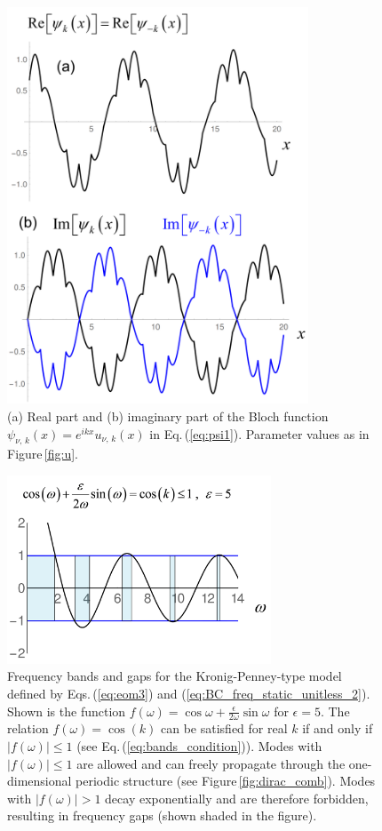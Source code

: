 \begin{figure}
    \centering
    \includegraphics[width=0.8\textwidth, keepaspectratio]{figures/system/psi.png}
    \caption{(a) Real part and (b) imaginary part of the Bloch function 
    $\psi_{\nu,\,k}(x) = e^{i k x} u_{\nu,\,k}(x)$ in Eq.\,(\ref{eq:psi1}). 
    Parameter values as in Figure\,\ref{fig:u}.}  
    \label{fig:psi}
\end{figure}
%
\begin{figure}
    \centering
    \includegraphics[width=0.7\textwidth, keepaspectratio]{figures/system/cosk.png}
    \caption{Frequency bands and gaps for the Kronig-Penney-type model defined by 
    Eqs.\,(\ref{eq:eom3}) and (\ref{eq:BC_freq_static_unitless_2}).
    Shown is the function
    $f(\omega) = \cos{\omega} + \frac{\epsilon}{2 \omega} \sin{\omega}$ for $\epsilon=5$. 
    The relation $f(\omega) = \cos(k)$ can be satisfied for real $k$ if and only if 
    $|f(\omega)| \le 1$ (see Eq.\,(\ref{eq:bands_condition})). 
    Modes with $|f(\omega)| \le 1$
    are allowed and can freely propagate through the one-dimensional periodic structure
    (see Figure\,\ref{fig:dirac_comb}).
    Modes with $|f(\omega)| > 1$ decay exponentially and are therefore forbidden, 
    resulting in frequency gaps (shown shaded in the figure).}
    \label{fig:band_condition}
\end{figure}
